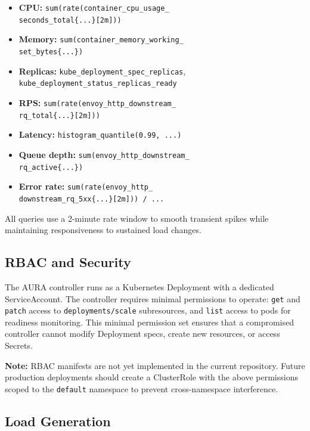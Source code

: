 \documentclass[conference]{IEEEtran}
\begin{document}
\begin{itemize}
\item \textbf{CPU:} \texttt{sum(rate(container\_cpu\_usage\_\\
  seconds\_total\{...\}[2m]))}
\item \textbf{Memory:} \texttt{sum(container\_memory\_working\_\\
  set\_bytes\{...\})}
\item \textbf{Replicas:} \texttt{kube\_deployment\_spec\_replicas},
  \texttt{kube\_deployment\_status\_replicas\_ready}
\item \textbf{RPS:} \texttt{sum(rate(envoy\_http\_downstream\_\\
  rq\_total\{...\}[2m]))}
\item \textbf{Latency:} \texttt{histogram\_quantile(0.99, ...)}
\item \textbf{Queue depth:} \texttt{sum(envoy\_http\_downstream\_\\
  rq\_active\{...\})}
\item \textbf{Error rate:} \texttt{sum(rate(envoy\_http\_\\
  downstream\_rq\_5xx\{...\}[2m])) / ...}
\end{itemize}

All queries use a 2-minute rate window to smooth transient spikes while
maintaining responsiveness to sustained load changes.

\subsection{RBAC and Security}

The AURA controller runs as a Kubernetes Deployment with a dedicated
ServiceAccount. The controller requires minimal permissions to operate:
\texttt{get} and \texttt{patch} access to \texttt{deployments/scale}
subresources, and \texttt{list} access to pods for readiness monitoring.
This minimal permission set ensures that a compromised controller cannot
modify Deployment specs, create new resources, or access Secrets.

\textbf{Note:} RBAC manifests are not yet implemented in the current
repository. Future production deployments should create a ClusterRole
with the above permissions scoped to the \texttt{default} namespace
to prevent cross-namespace interference.

\subsection{Load Generation}
\end{document}
